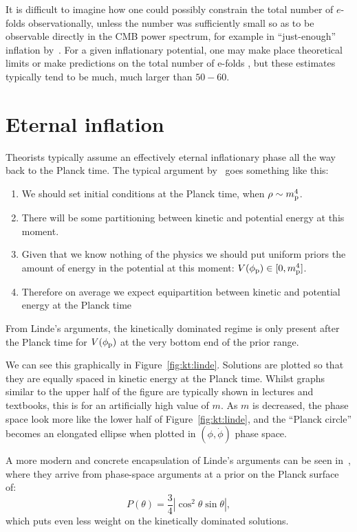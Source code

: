 It is difficult to imagine how one could possibly constrain the total number of \(e\)-folds observationally, unless the number was sufficiently small so as to be observable directly in the CMB power spectrum, for example in ``just-enough'' inflation by~\cite{Ramirez_excluded_2009,Ramirez_predictions_2012}. For a given inflationary potential, one may make place theoretical limits or make predictions on the total number of e-folds \citep{how_many_e_folds}, but these estimates typically tend to be much, much larger than \(50-60\).

\section{Eternal inflation}
Theorists typically assume an effectively eternal inflationary phase all the way back to the Planck time.  
The typical argument by~\cite{Linde_review} goes something like this:
\begin{enumerate}
  \item We should set initial conditions at the Planck time, when
    \(\rho\sim m_{\mathrm{p}}^4\).
  \item There will be some partitioning between kinetic and potential
    energy at this moment.
  \item Given that we know nothing of the physics we should put
    uniform priors the amount of energy in the potential at this
    moment: \(V(\phi_{\mathrm{p}})\in[0,m_{\mathrm{p}}^4]\).
  \item Therefore on average we expect equipartition between kinetic
    and potential energy at the Planck time
\end{enumerate}

From Linde's arguments, the kinetically dominated regime is only present
after the Planck time for \(V(\phi_{\mathrm{p}})\) at the very bottom end of the
prior range.

We can see this graphically in Figure~\ref{fig:kt:linde}. Solutions are plotted so that they are equally spaced in kinetic energy at the Planck time. Whilst graphs similar to the upper half of the figure are typically shown in lectures and textbooks, this is for an artificially high value of \(m\). As \(m\) is decreased, the phase space look more like the lower half of Figure~\ref{fig:kt:linde}, and the ``Planck circle'' becomes an elongated ellipse when plotted in \((\phi, \dot{\phi})\) phase space. 

A more modern and concrete encapsulation of Linde's arguments can be seen in~\cite{how_many_e_folds}, where they arrive from phase-space arguments at a prior on the Planck surface of:
\begin{equation}
  P(\theta) = \frac{3}{4} \left|\cos^2\theta\sin\theta\right|,
\end{equation}
which puts even less weight on the kinetically dominated solutions.


